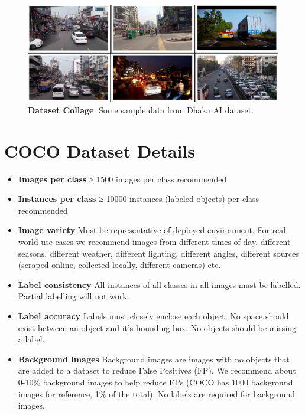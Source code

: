 \begin{figure}[H] %
  \centering
  \includegraphics[width=\textwidth]{figures/paper/dataset-collage.jpg}
  \caption[Dataset Collage]{\textbf{Dataset Collage}. Some sample data from Dhaka AI dataset.}
  \label{fig:figures/paper/dataset-collage.jpg}
\end{figure}



\section{COCO Dataset Details}
\begin{itemize}
  \item \textbf{Images per class} ≥ 1500 images per class recommended
  \item \textbf{Instances per class} ≥ 10000 instances (labeled objects) per class recommended
  \item \textbf{Image variety} Must be representative of deployed environment. For real-world use cases we recommend images from different times of day, different seasons, different weather, different lighting, different angles, different sources (scraped online, collected locally, different cameras) etc.
 \item \textbf{Label consistency} All instances of all classes in all images must be labelled. Partial labelling will not work.
 \item \textbf{Label accuracy} Labels must closely enclose each object. No space should exist between an object and it's bounding box. No objects should be missing a label.
 \item \textbf{Background images} Background images are images with no objects that are added to a dataset to reduce False Positives (FP). We recommend about 0-10\% background images to help reduce FPs (COCO has 1000 background images for reference, 1\% of the total). No labels are required for background images.
\end{itemize}


